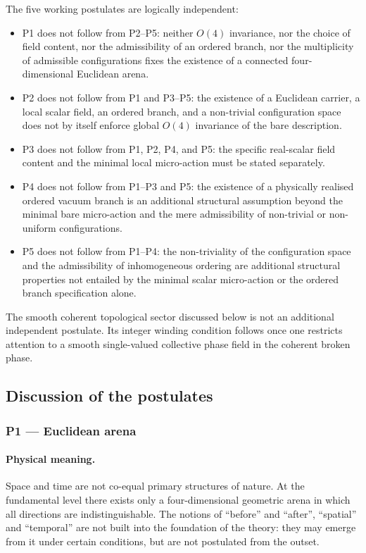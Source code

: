 \documentclass[11pt,a4paper]{article}
\numberwithin{equation}{section}
\begin{document}
The five working postulates are logically independent:
\begin{itemize}
  \item P1 does not follow from P2--P5: neither $O(4)$ invariance, nor
    the choice of field content, nor the admissibility of an ordered
    branch, nor the multiplicity of admissible configurations fixes the
    existence of a connected four-dimensional Euclidean arena.
  \item P2 does not follow from P1 and P3--P5: the existence of a
    Euclidean carrier, a local scalar field, an ordered branch, and a
    non-trivial configuration space does not by itself enforce global
    $O(4)$ invariance of the bare description.
  \item P3 does not follow from P1, P2, P4, and P5: the specific
    real-scalar field content and the minimal local micro-action must be
    stated separately.
  \item P4 does not follow from P1--P3 and P5: the existence of a
    physically realised ordered vacuum branch is an additional
    structural assumption beyond the minimal bare micro-action and the
    mere admissibility of non-trivial or non-uniform configurations.
  \item P5 does not follow from P1--P4: the non-triviality of the
    configuration space and the admissibility of inhomogeneous ordering
    are additional structural properties not entailed by the minimal
    scalar micro-action or the ordered branch specification alone.
\end{itemize}

The smooth coherent topological sector discussed below is not an
additional independent postulate. Its integer winding condition follows
once one restricts attention to a smooth single-valued collective phase
field in the coherent broken phase.

\subsection{Discussion of the postulates}
\label{sec:postulates_discussion}

\subsubsection*{P1 --- Euclidean arena}

\paragraph{Physical meaning.}
Space and time are not co-equal primary structures of nature.
At the fundamental level there exists only a four-dimensional
geometric arena in which all directions are indistinguishable.
The notions of ``before'' and ``after'', ``spatial'' and ``temporal''
are not built into the foundation of the theory: they may emerge
from it under certain conditions, but are not postulated from the outset.
\end{document}
